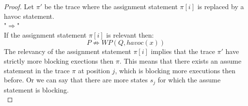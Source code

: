 \documentclass{article}
\newcommand{\limp}{\Rightarrow}
\begin{document}
\begin{proof}
Let $\pi'$ be the trace where the assignment statement $\pi[i]$ is replaced by a havoc statement. \\
"$\Rightarrow$" \\
If the assignment statement $\pi[i]$ is relevant then:
$$P \not \limp WP(Q,havoc(x))$$
The relevancy of the assignment statement $\pi[i]$ implies that the trace $\pi'$ have strictly more blocking exections then $\pi$. This means that there exists an assume statement in the trace $\pi$ at position $j$, which is blocking more executions then before. Or we can say that there are more states $s_j$ for which the assume statement is blocking. \\

\end{proof}
\end{document}
